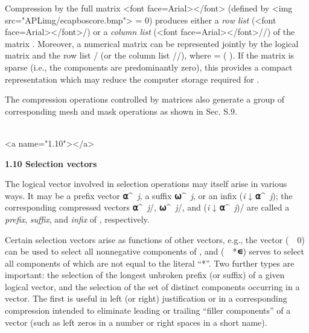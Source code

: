 \par Compression by the full matrix <font face=Arial></font> (defined by <img src="APLimg/ecapboscore.bmp"> = 0) produces either a \textit{row list} (<font face=Arial></font>/) or a \textit{column list} (<font face=Arial></font>//) of the matrix . Moreover, a numerical matrix  can be represented jointly by the logical matrix
 and the row list 
/ (or the column list //), where  = ( ). If the matrix  is sparse (i.e., the components are predominantly zero), this provides a compact representation which may reduce the computer storage required for .

\par The compression operations controlled by matrices also generate a group of corresponding mesh and mask operations as shown in Sec. S.9.
\\\ 



<a name="1.10"></a>
\par \textbf{1.10 Selection vectors}

\par The logical vector  involved in selection operations may itself arise in various ways. It may be a prefix vector 
\textbf{⍺}^{\textit{\ j}}, a suffix
\textbf{⍵}^{\textit{\ j}}, or an infix (\textit{i} ↓ \textbf{⍺}^{\textit{\ j}}); the corresponding compressed vectors
\textbf{⍺}^{\textit{\ j}}/,
\textbf{⍵}^{\textit{\ j}}/, and (\textit{i} ↓ \textbf{⍺}^{\textit{\ j}})/ are called a \textit{prefix}, \textit{suffix}, and \textit{infix} of , respectively.

\par Certain selection vectors arise as functions of other vectors, e.g., the vector (\ \geq\ 0) can be used to select all nonnegative components of , and (\ \neq\ *\textbf{∊}) serves to select all components of  which are not equal to the literal ``*''. Two further types are important: the selection of the longest unbroken prefix (or suffix) of a given logical vector, and the selection of the set of distinct components occurring in a vector. The first is useful in left (or right) justification or in a corresponding compression intended to eliminate leading or trailing ``filler components'' of a vector (such as left zeros in a number or right spaces in a short name).

